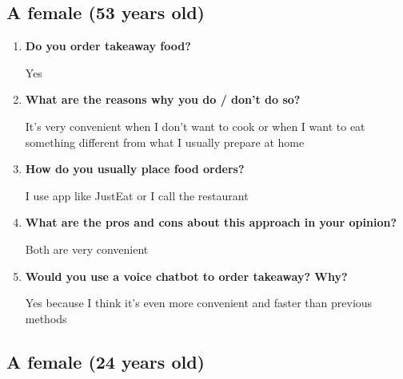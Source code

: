 
\subsection*{A female (53 years old)}

\begin{enumerate}

\item \textbf{Do you order takeaway food?}

Yes

\item \textbf{What are the reasons why you do / don't do so?}

It's very convenient when I don't want to cook or when I want to eat something different from what I usually prepare at home

\item \textbf{How do you usually place food orders?}

I use app like JustEat or I call the restaurant

\item \textbf{What are the pros and cons about this approach in your opinion?}

Both are very convenient

\item \textbf{Would you use a voice chatbot to order takeaway? Why?}

Yes because I think it's even more convenient and faster than previous methods

\end{enumerate}


\subsection*{A female (24 years old)}

